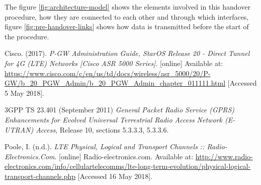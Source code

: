 \documentclass[12pt, a4paper]{article}
\begin{document}
The figure \ref{fig:architecture-model} shows the elements involved in this
handover procedure, how they are connected to each other and through which
interfaces, figure \ref{fig:pre-handover-links} shows how data is transmitted
before the start of the procedure.








\begin{thebibliography}{99}
\footnotesize

  Cisco. (2017).
  \textit{P-GW Administration Guide, StarOS Release 20 - Direct Tunnel for 4G (LTE) Networks [Cisco ASR 5000 Series]}. [online]
  Available at: \url{https://www.cisco.com/c/en/us/td/docs/wireless/asr_5000/20/P-GW/b_20_PGW_Admin/b_20_PGW_Admin_chapter_011111.html}
  [Accessed 5 May 2018].

  3GPP TS 23.401 (September 2011)
  \textit{General Packet Radio Service (GPRS) Enhancements for Evolved Universal
  Terrestrial Radio Access Network (E-UTRAN) Access},
  Release 10,
  sections 5.3.3.3, 5.3.3.6.

  Poole, I. (n.d.).
  \textit{LTE Physical, Logical and Transport Channels :: Radio-Electronics.Com}. [online]
  Radio-electronics.com.
  Available at: \url{http://www.radio-electronics.com/info/cellulartelecomms/lte-long-term-evolution/physical-logical-transport-channels.php}
  [Accessed 16 May 2018].


\end{thebibliography}
\end{document}
